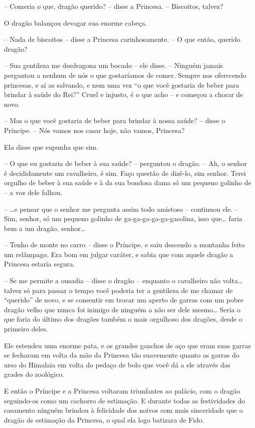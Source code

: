 -- Comeria o que, dragão querido? -- disse a Princesa. -- Biscoitos,
talvez?

O dragão balançou devagar sua enorme cabeça.

-- Nada de biscoitos -- disse a Princesa carinhosamente. -- O que então,
querido dragão?

-- Sua gentileza me desdragona um bocado -- ele disse. -- Ninguém jamais
perguntou a nenhum de nós o que gostaríamos de comer. Sempre nos
oferecendo princesas, e aí as salvando, e nem uma vez “o que você
gostaria de beber para brindar à saúde do Rei?” Cruel e injusto, é o
que acho -- e começou a chorar de novo.

-- Mas o que você gostaria de beber para brindar à nossa saúde? -- disse
o Príncipe. -- Nós vamos nos casar hoje, não vamos, Princesa?

Ela disse que supunha que sim.

-- O que eu gostaria de beber à sua saúde? -- perguntou o dragão. -- Ah,
o senhor é decididamente um cavalheiro, é sim. Faço questão de
dizê-lo, sim senhor. Terei orgulho de beber à sua saúde e à da sua
bondosa dama só um pequeno golinho de -- a voz dele falhou. 

-- …e pensar que o senhor me pergunta assim todo amistoso -- continuou
ele. -- Sim, senhor, só um pequeno golinho de ga-ga-ga-ga-ga-gasolina,
isso que… faria bem a um dragão, senhor…

-- Tenho de monte no carro -- disse o Príncipe, e saiu descendo a
montanha feito um relâmpago. Era bom em julgar caráter, e sabia que
com aquele dragão a Princesa estaria segura.

-- Se me permite a ousadia -- disse o dragão -- enquanto o cavalheiro não
volta… talvez só para passar o tempo você poderia ter a gentileza de
me chamar de “querido” de novo, e se consentir em trocar um aperto de
garras com um pobre dragão velho que nunca foi inimigo de ninguém a
não ser dele mesmo… Seria o que faria do último dos dragões também o
mais orgulhoso dos dragões, desde o primeiro deles.

Ele estendeu uma enorme pata, e os grandes ganchos de aço que eram
suas garras se fecharam em volta da mão da Princesa tão suavemente
quanto as garras do urso do Himalaia em volta do pedaço de bolo que
você dá a ele através das grades do zoológico.

E então o Príncipe e a Princesa voltaram triunfantes ao palácio, com o
dragão seguindo-os como um cachorro de estimação. E durante todas as
festividades do casamento ninguém brindou à felicidade dos noivos com
mais sinceridade que o dragão de estimação da Princesa, o qual ela
logo batizara de Fido.

